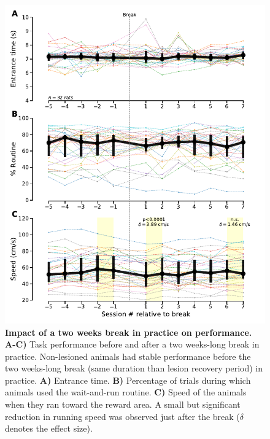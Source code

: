 \begin{figure}[h!]
	\begin{center}
		\includegraphics[scale=1]{ch-appendicies/figures/BreakEffect.pdf}
		\caption
		{\textbf{Impact of a two weeks break in practice on performance.}
		\textbf{A-C)} Task performance before and after a two weeks-long break in practice.
		Non-lesioned animals had stable performance before the two weeks-long break (same duration than lesion recovery period) in practice.
		\textbf{A)} Entrance time.
		\textbf{B)} Percentage of trials during which animals used the wait-and-run routine.
		\textbf{C)} Speed of the animals when they ran toward the reward area.
		A small but significant reduction in running speed was observed just after the break ($\delta$ denotes the effect size).
		}
		\label{fig:appendix:break}
	\end{center}
\end{figure}